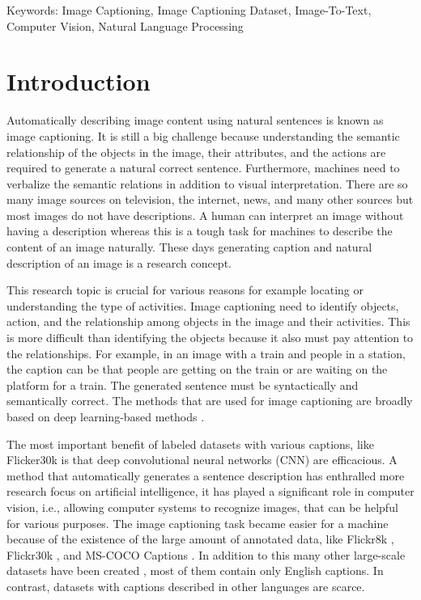 \documentclass[10pt]{cai}
\begin{document}
\begin{keywords}{Keywords:}
  Image Captioning, Image Captioning Dataset, Image-To-Text, Computer Vision, Natural Language Processing
\end{keywords}
\copyrightnotice

\section{Introduction}
\label{intro}
Automatically describing image content using natural sentences is known as image captioning.
It is still a big challenge because understanding the semantic relationship of the objects in the image, their attributes, and the actions are required to generate a natural correct sentence.
Furthermore, machines need to verbalize the semantic relations in addition to visual interpretation.
There are so many image sources on television, the internet, news, and many other sources but most images do not have descriptions.
A human can interpret an image without having a description whereas this is a tough task for machines to describe the content of an image naturally.
These days generating caption and natural description of an image is a research concept.

This research topic is crucial for various reasons for example locating or understanding the type of activities.
Image captioning need to identify objects, action, and the relationship among objects in the image and their activities.
This is more difficult than identifying the objects because it also must pay attention to the relationships.
For example, in an image with a train and people in a station, the caption can be that people are getting on the train or are waiting on the platform for a train. 
The generated sentence must be syntactically and semantically correct. 
The methods that are used for image captioning are broadly based on deep learning-based methods \cite{bahdanau2014neural,cho2014learning, sutskever2014sequence, szegedy2015going}.

The most important benefit of labeled datasets with various captions, like Flicker30k \cite{plummer2015flickr30k} is that deep convolutional neural networks (CNN) are efficacious.
A method that automatically generates a sentence description has enthralled more research focus on artificial intelligence, it has played a significant role in computer vision, i.e., allowing computer systems to recognize images, that can be helpful for various purposes.
The image captioning task became easier for a machine because of the existence of the large amount of annotated data, like Flickr8k \cite{hodosh2013framing}, Flickr30k \cite{plummer2015flickr30k}, and MS-COCO Captions \cite{chen2015microsoft}. 
In addition to this many other large-scale datasets have been created \cite{sharma2018conceptual}, most of them contain only English captions.
In contrast, datasets with captions described in other languages are scarce.
\end{document}

